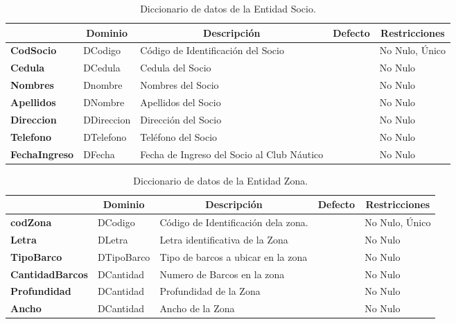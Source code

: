 \begin{table}[H]
\centering
\caption{Diccionario de datos de la Entidad Socio.}
\label{tab-DiccR-3e}
\begin{tabular}{>{\bfseries}m{4.0cm}>{}m{3.0cm}>{}m{6.0cm}>{}m{5.0cm}>{}m{2.0cm}}
\toprule
\multicolumn{1}{c}{\textbf{Atributo}} & \multicolumn{1}{c}{\textbf{Dominio}} & \multicolumn{1}{c}{\textbf{Descripción}} & \multicolumn{1}{c}{\textbf{Defecto}} & \multicolumn{1}{c}{\textbf{Restricciones}} \\ \midrule
CodSocio	&	DCodigo	&	Código de Identificación del Socio	&		&	No Nulo, Único\\
Cedula	&	DCedula	&	Cedula del Socio	&		&	No Nulo\\
Nombres	&	Dnombre	&	Nombres del Socio	&		&	No Nulo\\
Apellidos	&	DNombre	&	Apellidos del Socio	&		&	No Nulo\\
Direccion	&	DDireccion	&	Dirección del Socio	&		&	No Nulo\\
Telefono	&	DTelefono	&	Teléfono del Socio	&		&	No Nulo\\
FechaIngreso	&	DFecha	&	Fecha de Ingreso del Socio al Club Náutico	&		&	No Nulo\\
\bottomrule
\end{tabular}
\end{table}

\begin{table}[H]
\centering
\caption{Diccionario de datos de la Entidad Zona.}
\label{tab-DiccR-3f}
\begin{tabular}{>{\bfseries}m{4.0cm}>{}m{3.0cm}>{}m{6.0cm}>{}m{5.0cm}>{}m{2.0cm}}
\toprule
\multicolumn{1}{c}{\textbf{Atributo}} & \multicolumn{1}{c}{\textbf{Dominio}} & \multicolumn{1}{c}{\textbf{Descripción}} & \multicolumn{1}{c}{\textbf{Defecto}} & \multicolumn{1}{c}{\textbf{Restricciones}} \\ \midrule
codZona	&	DCodigo	&	Código de Identificación dela zona.	&		&	No Nulo, Único\\
Letra	&	DLetra	&	Letra identificativa de la Zona	&		&	No Nulo\\
TipoBarco	&	DTipoBarco	&	Tipo de barcos a ubicar en la zona	&		&	No Nulo\\
CantidadBarcos	&	DCantidad	&	Numero de Barcos en la zona	&		&	No Nulo\\
Profundidad	&	DCantidad	&	Profundidad de la Zona	&		&	No Nulo\\
Ancho	&	DCantidad	&	Ancho de la Zona	&		&	No Nulo\\
\bottomrule
\end{tabular}
\end{table}

